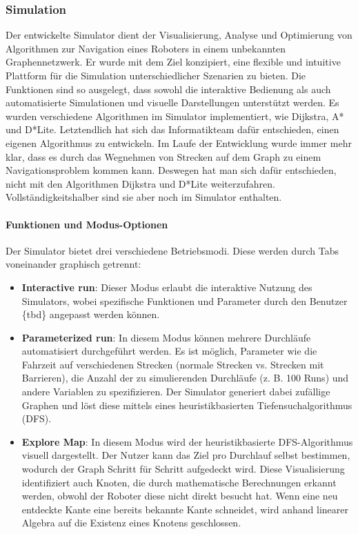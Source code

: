\documentclass[main.tex]{subfiles} %
\begin{document}
\subsubsection{Simulation}

Der entwickelte Simulator dient der Visualisierung, Analyse und Optimierung von Algorithmen zur Navigation eines Roboters in einem unbekannten Graphennetzwerk. Er wurde mit dem Ziel konzipiert, eine flexible und intuitive Plattform für die Simulation unterschiedlicher Szenarien zu bieten. Die Funktionen sind so ausgelegt, dass sowohl die interaktive Bedienung als auch automatisierte Simulationen und visuelle Darstellungen unterstützt werden.
Es wurden verschiedene Algorithmen im Simulator implementiert, wie Dijkstra, A* und D*Lite.
Letztendlich hat sich das Informatikteam dafür entschieden, einen eigenen Algorithmus zu entwickeln.
Im Laufe der Entwicklung wurde immer mehr klar, dass es durch das Wegnehmen von Strecken auf dem Graph
zu einem Navigationsproblem kommen kann. Deswegen hat man sich dafür entschieden, nicht mit den Algorithmen
Dijkstra und D*Lite weiterzufahren. Vollständigkeitshalber sind sie aber noch im Simulator enthalten.

\paragraph{Funktionen und Modus-Optionen}

Der Simulator bietet drei verschiedene Betriebsmodi. Diese werden durch Tabs voneinander graphisch getrennt:

\begin{itemize}
    \item \textbf{Interactive run}:
    Dieser Modus erlaubt die interaktive Nutzung des Simulators, wobei spezifische Funktionen und Parameter durch den Benutzer \{tbd\} angepasst werden können.

    \item \textbf{Parameterized run}:  
    In diesem Modus können mehrere Durchläufe automatisiert durchgeführt werden. Es ist möglich, Parameter wie die Fahrzeit auf verschiedenen Strecken (normale Strecken vs. Strecken mit Barrieren), die Anzahl der zu simulierenden Durchläufe (z. B. 100 Runs) und andere Variablen zu spezifizieren. Der Simulator generiert dabei zufällige Graphen und löst diese mittels eines heuristikbasierten Tiefensuchalgorithmus (DFS).

    \item \textbf{Explore Map}:  
    In diesem Modus wird der heuristikbasierte DFS-Algorithmus visuell dargestellt. Der Nutzer kann das Ziel pro Durchlauf selbst bestimmen, wodurch der Graph Schritt für Schritt aufgedeckt wird. Diese Visualisierung identifiziert auch Knoten, die durch mathematische Berechnungen erkannt werden, obwohl der Roboter diese nicht direkt besucht hat. Wenn eine neu entdeckte Kante eine bereits bekannte Kante schneidet, wird anhand linearer Algebra auf die Existenz eines Knotens geschlossen.
\end{itemize}
\end{document}
